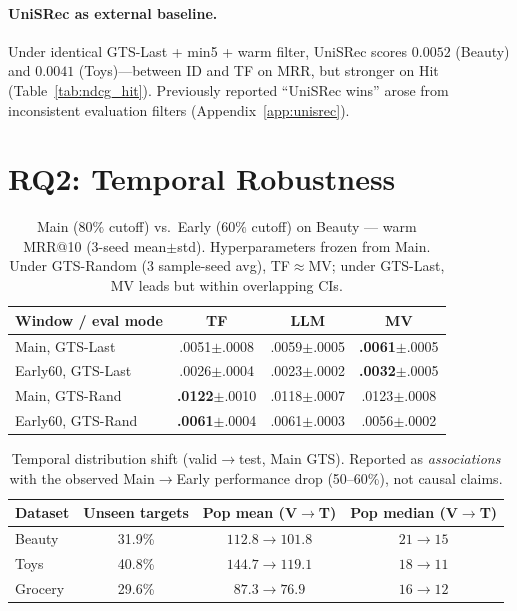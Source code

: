 \documentclass[sigconf,natbib=true,anonymous]{acmart}
\begin{document}
\paragraph{UniSRec as external baseline.}
Under identical GTS-Last + min5 + warm filter, UniSRec scores $0.0052$ (Beauty) and $0.0041$ (Toys)---between ID and TF on MRR, but stronger on Hit (Table~\ref{tab:ndcg_hit}).
Previously reported ``UniSRec wins'' arose from inconsistent evaluation filters (Appendix~\ref{app:unisrec}).

\section{RQ2: Temporal Robustness}
\label{sec:rq2}

\begin{table}[t]
\centering
\caption{%
Main ($80\%$ cutoff) vs.\ Early ($60\%$ cutoff) on Beauty --- warm MRR@10 (3-seed mean$\pm$std).
Hyperparameters frozen from Main.
Under GTS-Random (3 sample-seed avg), TF$\approx$MV; under GTS-Last, MV leads but within overlapping CIs.%
}
\label{tab:early}
\small
\begin{tabular}{@{}lccc@{}}
\toprule
Window / eval mode & TF & LLM & MV \\
\midrule
Main, GTS-Last    & .0051\tiny{$\pm$.0008} & .0059\tiny{$\pm$.0005} & \textbf{.0061}\tiny{$\pm$.0005} \\
Early60, GTS-Last & .0026\tiny{$\pm$.0004} & .0023\tiny{$\pm$.0002} & \textbf{.0032}\tiny{$\pm$.0005} \\
\midrule
Main, GTS-Rand    & \textbf{.0122}\tiny{$\pm$.0010} & .0118\tiny{$\pm$.0007} & .0123\tiny{$\pm$.0008} \\
Early60, GTS-Rand & \textbf{.0061}\tiny{$\pm$.0004} & .0061\tiny{$\pm$.0003} & .0056\tiny{$\pm$.0002} \\
\bottomrule
\end{tabular}
\end{table}

\begin{table}[t]
\centering
\caption{%
Temporal distribution shift (valid$\to$test, Main GTS).
Reported as \emph{associations} with the observed Main$\to$Early performance drop (50--60\%), not causal claims.%
}
\label{tab:shift}
\small
\setlength{\tabcolsep}{4pt}
\begin{tabular}{@{}lccc@{}}
\toprule
Dataset & Unseen targets & Pop mean (V$\to$T) & Pop median (V$\to$T) \\
\midrule
Beauty  & 31.9\% & $112.8 \to 101.8$ & $21 \to 15$ \\
Toys    & 40.8\% & $144.7 \to 119.1$ & $18 \to 11$ \\
Grocery & 29.6\% & $87.3 \to 76.9$ & $16 \to 12$ \\
\bottomrule
\end{tabular}
\end{table}
\end{document}
